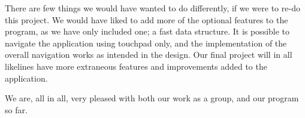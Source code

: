 \documentclass[a4paper,11pt]{article}
\begin{document}
There are few things we would have wanted to do differently, if we were to re-do this project. We would have liked to add more of the optional features to the program, as we have only included one; a fast data structure.
It is possible to navigate the application using touchpad only, and the implementation of the overall navigation works as intended in the design.
Our final project will in all likelines have more extraneous features and improvements added to the application.

We are, all in all, very pleased with both our work as a group, and our program so far.
\end{document}
